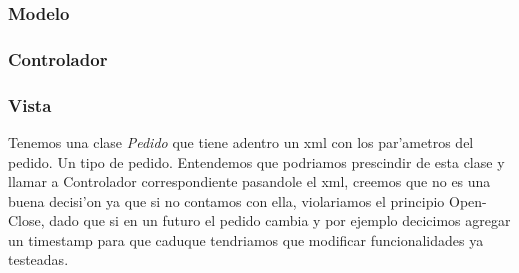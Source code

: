 
\subsubsection{Modelo}

\subsubsection{Controlador}

\subsubsection{Vista}

Tenemos una clase \textit{Pedido} que tiene adentro un xml con los par'ametros del pedido. Un tipo de pedido.
Entendemos que podriamos prescindir de esta clase y llamar a Controlador correspondiente pasandole el xml,
creemos que no es una buena decisi'on ya que si no contamos con ella, violariamos el principio Open-Close, dado 
que si en un futuro el pedido cambia y por ejemplo decicimos agregar un timestamp para que caduque tendriamos que 
modificar funcionalidades ya testeadas.

